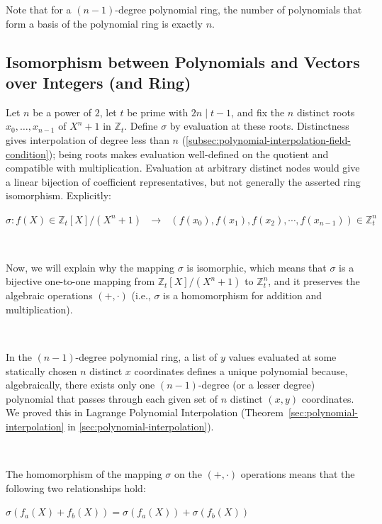 Note that for a $(n-1)$-degree polynomial ring, the number of polynomials that form a basis of the polynomial ring is exactly $n$.


\subsection{Isomorphism between Polynomials and Vectors over Integers (and Ring)}
\label{subsec:poly-vector-transformation}



Let $n$ be a power of $2$, let $t$ be prime with $2n\mid t-1$, and fix the $n$ distinct roots $x_0,\ldots,x_{n-1}$ of $X^n+1$ in $\mathbb Z_t$. Define $\sigma$ by evaluation at these roots. Distinctness gives interpolation of degree less than $n$ (\autoref{subsec:polynomial-interpolation-field-condition}); being roots makes evaluation well-defined on the quotient and compatible with multiplication. Evaluation at arbitrary distinct nodes would give a linear bijection of coefficient representatives, but not generally the asserted ring isomorphism. Explicitly:

$\sigma: f(X) \in \mathbb{Z}_t[X] / (X^n + 1) \text{ } \longrightarrow \text{ } (f(x_0), f(x_1), f(x_2), \cdots, f(x_{n-1})) \in \mathbb{Z}^n_t$

$ $

Now, we will explain why the mapping $\sigma$ is isomorphic, which means that $\sigma$ is a bijective one-to-one mapping from $\mathbb{Z}_t[X] / (X^n + 1)$ to $\mathbb{Z}^n_t$, and it preserves the algebraic operations $(+, \cdot)$ (i.e., $\sigma$ is a homomorphism for addition and multiplication).

$ $

 In the $(n-1)$-degree polynomial ring, a list of $y$ values evaluated at some statically chosen $n$ distinct $x$ coordinates defines a unique polynomial because, algebraically, there exists only one $(n-1)$-degree (or a lesser degree) polynomial that passes through each given set of $n$ distinct $(x, y)$ coordinates. We proved this in Lagrange Polynomial Interpolation (Theorem~\ref*{sec:polynomial-interpolation} in \autoref{sec:polynomial-interpolation}). 

$ $

 The homomorphism of the mapping $\sigma$ on the $(+, \cdot)$ operations means that the following two relationships hold: 

$\sigma(f_a(X) + f_b(X)) = \sigma(f_a(X)) + \sigma(f_b(X))$

